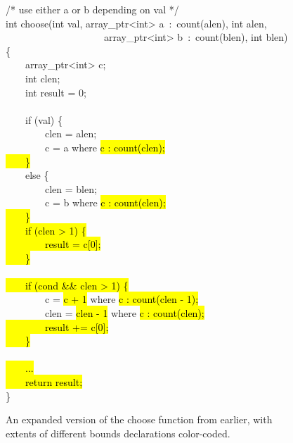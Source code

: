 \begin{figure}
\begin{tt}
/* use either a or b depending on val */\\
int choose(int val, array\_ptr<int> a~:~count(alen), int alen,\\
\mbox{~~~~~~~~~~~~~~~~~~~~}array\_ptr<int> b~:~count(blen), int blen)\\
\{\\
\mbox{~~~~}array\_ptr<int> c;\\
\mbox{~~~~}int clen;\\
\mbox{~~~~}int result = 0;\\
\\
\mbox{~~~~}if (val) \{\\
\mbox{~~~~~~~~}clen = alen;\\
\mbox{~~~~~~~~}c = a where \hl{c : count(clen);\\
\mbox{~~~~}\}}\\
\mbox{~~~~}else \{\\
\mbox{~~~~~~~~}clen = blen;\\
\mbox{~~~~~~~~}c = b where \hl{c : count(clen);\\
\mbox{~~~~}\}\\
\mbox{~~~~}if (clen > 1) \{\\
\mbox{~~~~~~~~}result = c[0];\\
\mbox{~~~~}\}\\
\\
\mbox{~~~~}if (cond  \&\& clen > 1) \{}\\
\mbox{~~~~~~~~}c = \hl{c + 1} where \hl{c : count(clen - 1);}\\
\mbox{~~~~~~~~}clen = \hl{clen - 1} where \hl{c : count(clen);\\
\mbox{~~~~~~~~}result += c[0];\\
\mbox{~~~~}\}\\
\\ 
\mbox{~~~~}...\\
\mbox{~~~~}return result;\\
}\}\\
\end{tt}
\caption{An expanded version of the choose function from earlier, with extents of different bounds declarations color-coded.}
\label{fig:bounds-extent:choose}
\end{figure}

